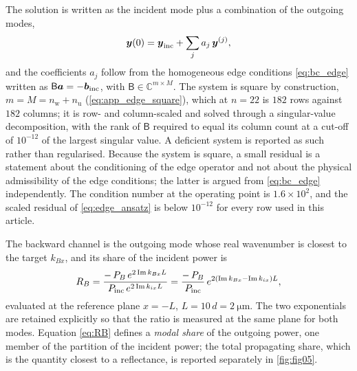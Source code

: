 The solution is written as the incident mode plus a combination of the outgoing
modes,
\begin{equation}
\label{eq:edge_ansatz}
\boldsymbol{y}(0)=\boldsymbol{y}_{\text{inc}}+\sum_{j}a_j\,\boldsymbol{y}^{(j)},
\end{equation}
and the coefficients $a_j$ follow from the homogeneous edge conditions
\eqref{eq:bc_edge} written as
$\mathsf{B}\boldsymbol{a}=-\boldsymbol{b}_{\text{inc}}$, with
$\mathsf{B}\in\mathbb{C}^{m\times M}$.  The system is square by construction,
$m=M=n_{\mathrm{w}}+n_{\mathrm{u}}$ (\eqref{eq:app_edge_square}), which at
$n=22$ is $182$ rows against $182$ columns; it is row- and column-scaled and
solved through a singular-value decomposition, with the rank of $\mathsf{B}$
required to equal its column count at a cut-off of $10^{-12}$ of the largest
singular value.  A deficient system is reported as such rather than regularised.
Because the system is square, a small residual is a statement about the
conditioning of the edge operator and not about the physical admissibility of the
edge conditions; the latter is argued from \eqref{eq:bc_edge} independently.  The condition number at the
operating point is $1.6\times10^{2}$, and the scaled residual of
\eqref{eq:edge_ansatz} is below $10^{-12}$ for every row used in this article.

The backward channel is the outgoing mode whose real wavenumber is closest to
the target $k_{Bx}$, and its share of the incident power is
\begin{equation}
\label{eq:RB}
R_B=\frac{-\,P_{B}\,e^{2\operatorname{Im} k_{Bx}L}}{P_{\text{inc}}\,e^{2\operatorname{Im} k_{ix}L}}
=\frac{-\,P_{B}}{P_{\text{inc}}}\,e^{2(\operatorname{Im} k_{Bx}-\operatorname{Im} k_{ix})L},
\end{equation}
evaluated at the reference plane $x=-L$, $L=10\,d=\SI{2}{\micro\metre}$.  The
two exponentials are retained explicitly so that the ratio is measured at the
same plane for both modes.  Equation \eqref{eq:RB} defines a \emph{modal share}
of the outgoing power, one member of the partition of the incident power; the
total propagating share, which is the quantity closest to a reflectance, is
reported separately in \cref{fig:fig05}.


